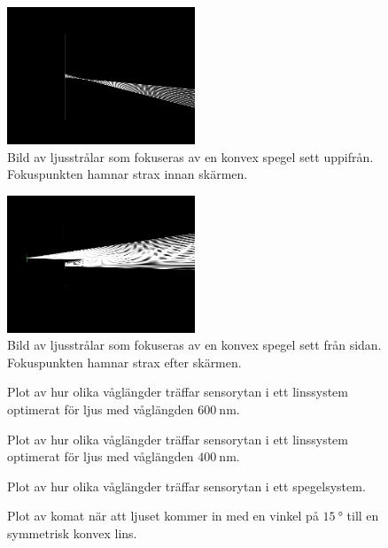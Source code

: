 \documentclass[a4paper]{article}
\begin{document}
\begin{figure}[h]
	\centering
	\includegraphics[width=0.5\textwidth]{Data/FRED/FRED1.jpg}
	\caption{Bild av ljusstrålar som fokuseras av en konvex spegel sett uppifrån. Fokuspunkten hamnar strax innan skärmen.}
	\label{fig:astigmAbove}
\end{figure}
\begin{figure}[h]
	\centering
	\includegraphics[width=0.5\textwidth]{Data/FRED/FRED2.jpg}
	\caption{Bild av ljusstrålar som fokuseras av en konvex spegel sett från sidan. Fokuspunkten hamnar strax efter skärmen.}
	\label{fig:astigmSide}
\end{figure}
\begin{figure}[h]
	\centering
	
	\caption{Plot av hur olika våglängder träffar sensorytan i ett linssystem optimerat för ljus med våglängden $\SI{600}{\nano\meter}$.}
	\label{fig:chrLens1}
\end{figure}
\begin{figure}[h]
	\centering
	
	\caption{Plot av hur olika våglängder träffar sensorytan i ett linssystem optimerat för ljus med våglängden $\SI{400}{\nano\meter}$.}
	\label{fig:chrLens2}
\end{figure}
\begin{figure}[h]
	\centering
	
	\caption{Plot av hur olika våglängder träffar sensorytan i ett spegelsystem.}
	\label{fig:chrMir}
\end{figure}
\begin{figure}[h]
	\centering
	
	\caption{Plot av komat när att ljuset kommer in med en vinkel på $\SI{15}{\degree}$ till en symmetrisk konvex lins.}
	\label{fig:comSym}
\end{figure}
\end{document}
